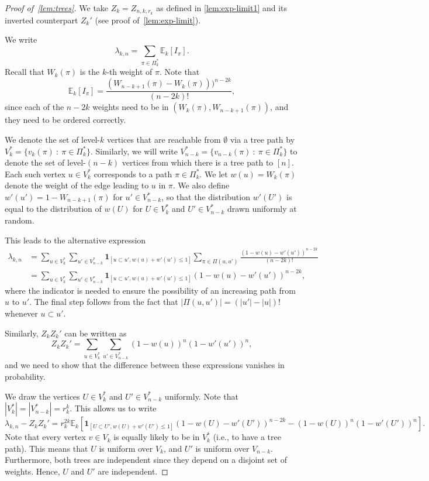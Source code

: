 \documentclass[11pt]{article}
\theoremstyle{definition}
\theoremstyle{remark}
\theoremstyle{remark}
\numberwithin{theorem}{section}
\newcommand{\E}{\mathbb{E}}
\newcommand{\I}[1]{{\mathbf 1}_{[#1]}}
\begin{document}
\begin{proof}[Proof of~\cref{lem:trees}]
    We take $Z_k=Z_{n,k,r_k}$ as defined in \cref{lem:exp-limit1} and its inverted counterpart $Z_k'$ (see proof of~\cref{lem:exp-limit}).

    We write
    \[
    \lambda_{k,n}=\sum_{\pi\in\Pi_k^*}\E_k[I_\pi].
    \]
    Recall that $W_k(\pi)$ is the $k$-th weight of $\pi$.
    Note that
    \[
    \E_k[I_\pi]=\frac{(W_{n-k+1}(\pi)-W_k(\pi)))^{n-2k}}{(n-2k)!},
    \]
    since each of the $n-2k$ weights need to be in $(W_k(\pi),W_{n-k+1}(\pi))$, and they need to be ordered correctly.

    
    We denote the set of level-$k$ vertices that are reachable from $\emptyset$ via a tree path by $V_k^*=\{v_k(\pi)\ :\ \pi\in\Pi^*_k\}$. Similarly, we will write $V_{n-k}^*=\{v_{n-k}(\pi)\ :\ \pi\in\Pi^*_k\}$ to denote the set of level-$(n-k)$ vertices from which there is a tree path to $[n]$.
    Each such vertex $u\in V_k^*$ corresponds to a path $\pi\in \Pi^*_k$. We let $w(u)=W_k(\pi)$ denote the weight of the edge leading to $u$ in $\pi$. We also define $w'(u')=1-W_{n-k+1}(\pi)$ for $u'\in V_{n-k}^*$, so that the distribution $w'(U')$ is equal to the distribution of $w(U)$ for $U\in V_k^*$ and $U'\in V_{n-k}^*$ drawn uniformly at random.

    This leads to the alternative expression
    \begin{align*}
    \lambda_{k,n}
    &=\sum_{u\in V_k^*}\sum_{u'\in V_{n-k}^*}\I{u\subset u',w(u)+w'(u')\le 1}\sum_{\pi\in\Pi(u,u')}\frac{(1-w(u)-w'(u'))^{n-2k}}{(n-2k)!}\\
    &=\sum_{u\in V_k^*}\sum_{u'\in V_{n-k}^*}\I{u\subset u',w(u)+w'(u')\le 1}(1-w(u)-w'(u'))^{n-2k},
    \end{align*}
    where the indicator is needed to ensure the possibility of an increasing path from $u$ to $u'$. The final step follows from the fact that $|\Pi(u,u')|=(|u'|-|u|)!$ whenever $u\subset u'$.

    Similarly, $Z_kZ_k'$ can be written as
    \[
    Z_kZ_k'=\sum_{u\in V_k^*}\sum_{u'\in V_{n-k}^*}\left(1-w(u)\right)^n\left(1-w'(u')\right)^n,
    \]
    and we need to show that the difference between these expressions vanishes in probability.


    We draw the vertices $U\in V_k^*$ and $U'\in V_{n-k}^*$ uniformly.
    Note that $|V_k^*|=|V_{n-k}^*|=r_k^k$. This allows us to write
    \[
    \lambda_{k,n}-Z_kZ_k'=r_k^{2k}\E_k[\I{U\subset U',w(U)+w'(U')\le 1}(1-w(U)-w'(U'))^{n-2k}-(1-w(U))^n(1-w'(U'))^n].
    \]
    Note that every vertex $v\in V_k$ is equally likely to be in $V_k^*$ (i.e., to have a tree path). This means that $U$ is uniform over $V_k$, and $U'$ is uniform over $V_{n-k}$. Furthermore, both trees are independent since they depend on a disjoint set of weights. Hence, $U$ and $U'$ are independent.
    

\end{proof}
\end{document}
